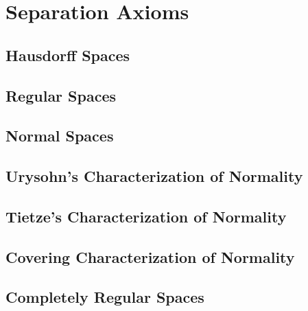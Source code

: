 \chapter{Separation Axioms}

\section{Hausdorff Spaces}

\section{Regular Spaces}

\section{Normal Spaces}

\section{Urysohn's Characterization of Normality}

\section{Tietze's Characterization of Normality}

\section{Covering Characterization of Normality}

\section{Completely Regular Spaces}
